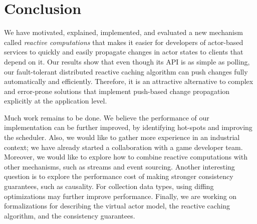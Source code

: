 \section{Conclusion}

We have motivated, explained, implemented, and evaluated a new mechanism called \emph{reactive computations} that makes it easier for developers of actor-based services to quickly and easily propagate changes in actor states to clients that depend on it. Our results show that even though its API is as simple as polling, our fault-tolerant distributed reactive caching algorithm can push changes fully automatically and efficiently. Therefore, it is an attractive alternative to complex and error-prone solutions that implement push-based change propagation explicitly at the application level. 

Much work remains to be done. We believe the performance of our implementation can be further improved, by identifying hot-spots and improving the scheduler. Also, we would like to gather more experience in an industrial context; we have already started a collaboration with a game developer team. Moreover, we would like to explore how to combine reactive computations with other mechanisms, such as streams and event sourcing. Another interesting question is to explore the performance cost of making stronger consistency guarantees, such as causality. For collection data types, using diffing optimizations may further improve performance. Finally, we are working on formalizations for describing the virtual actor model, the reactive caching algorithm, and the consistency guarantees.